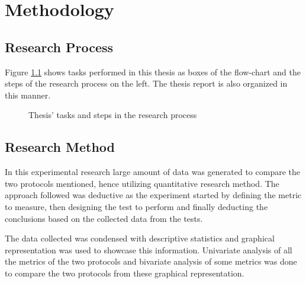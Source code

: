 \chapter{Methodology}

\section{Research Process}

Figure \ref{RePrSteps} shows tasks performed in this thesis as boxes of the flow-chart and the steps of the research process on the left. The thesis report is also organized in this manner.

\begin{figure}[h]
\centering
\def\svgwidth{0.93\columnwidth}

\vspace{-10pt}
\caption{Thesis' tasks and steps in the research process}
\label{RePrSteps}
\vspace{-10pt}
\end{figure}

\section{Research Method}

In this experimental research large amount of data was generated to compare the two protocols mentioned, hence utilizing quantitative research method. The approach followed was deductive as the experiment started by defining the metric to measure, then designing the test to perform and finally deducting the conclusions based on the collected data from the tests.

The data collected was condensed with descriptive statistics and graphical representation was used to showcase this information. Univariate analysis of all the metrics of the two protocols and bivariate analysis of some metrics was done to compare the two protocols from these graphical representation.
